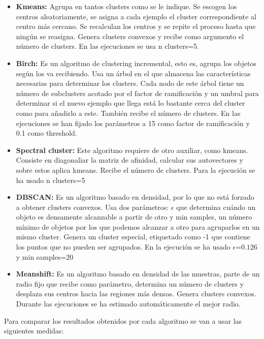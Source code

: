 \begin{itemize}
\item \textbf{Kmeans:} Agrupa en tantos clusters como se le indique. Se escogen los centros aleatoriamente, se asigna a cada ejemplo el cluster correspondiente al centro más cercano. Se recalculan los centros y se repite el proceso hasta que ningún se reasigna. Genera clusters convexos y recibe como argumento el número de clusters. En las ejecuciones se usa n clusters=5.
\item \textbf{Birch:} Es un algoritmo de clustering incremental, esto es, agrupa los objetos según los va recibiendo. Usa un árbol en el que almacena las características necesarias para determinar los clusters. Cada nodo de este árbol tiene un número de subclusters acotado por el factor de ramificación y un umbral para determinar si el nuevo ejemplo que llega está lo bastante cerca del cluster como para añadirlo a este. También recibe el número de clusters. En las ejecuciones se han fijado los parámetros a 15 como factor de ramificación y 0.1 como threshold.
\item \textbf{Spectral cluster:} Este algoritmo requiere de otro auxiliar, como kmeans. Consiste en diagonaliar la matriz de afinidad, calcular sus autovectores y sobre estos aplica kmeans. Recibe el número de clusters. Para la ejecución se ha usado n clusters=5
\item \textbf{DBSCAN:} Es un algoritmo basado en densidad, por lo que no está forzado a obtener clusters convexos. Usa dos parámetros: $\epsilon$ que determina cuándo un objeto es densamente alcanzable a partir de otro y min samples, un número mínimo de objetos por los que podemos alcanzar a otro para agruparlos en un mismo cluster. Genera un cluster especial, etiquetado como -1 que contiene los puntos que no pueden ser agrupados. En la ejecución se ha usado $\epsilon$=$0.126$ y min samples=20
\item \textbf{Meanshift:} Es un algoritmo basado en densidad de las muestras, parte de un radio fijo que recibe como parámetro, determina un número de clusters y desplaza sus centros hacia las regiones más densas. Genera clusters convexos. Durante las ejecuciones se ha estimado automáticamente el mejor radio.
\end{itemize}

Para comparar los resultados obtenidos por cada algoritmo se van a usar las siguientes medidas:

